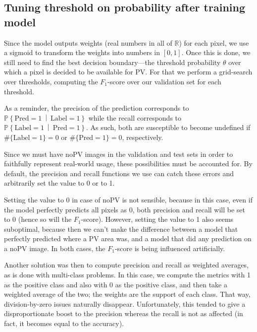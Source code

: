 \documentclass[10pt,conference]{IEEEtran}
\renewcommand\P[1]{\mathbb{P}\!\left\{#1\right\}}
\newcommand\given{\:\middle|\:}
\newcommand\tl[1]{\{\text{Label} = #1\}}
\newcommand\pl[1]{\{\text{Pred} = #1\}}
\begin{document}
\subsection{Tuning threshold on probability after training model} \label{ssec:threshold}
Since the model outputs weights (real numbers in all of $\mathbb{R}$) for each pixel,
we use a sigmoid to transform the weights into numbers in $[0,1]$.
Once this is done, we still need to find the best decision boundary---the threshold probability $\theta$ over which a pixel is decided to be available for PV.
For that we perform a grid-search over thresholds, computing the $F_1$-score over our validation set 
for each threshold.


As a reminder, the precision of the prediction
corresponds to $\P{\text{Pred}=1 \given \text{Label} = 1}$ while
the recall corresponds to $\P{\text{Label}=1 \given \text{Pred} = 1}$.
As such, both are susceptible to become undefined if
$\#\tl1 = 0$ or $\#\pl1 = 0$, respectively.

Since we must have noPV images in the validation and test sets in order to faithfully represent real-world usage,
these possibilities must be accounted for.
By default, the precision and recall functions we use
can catch these errors and arbitrarily set the value to
0 or to 1.

Setting the value to 0 in case of noPV is not sensible,
because in this case, even if the model perfectly predicts
all pixels as 0, both precision and recall will be set to 0
(hence so will the $F_1$-score).
However, setting the value to 1 also seems suboptimal, because
then we can't make the difference between a model that
perfectly predicted where a PV area was, and a model
that did any prediction on a noPV image.
In both cases, the $F_1$-score is being influenced artificially.

Another solution was then to compute precision and recall
as weighted averages, as is done with multi-class
problems.
In this case, we compute the metrics 
with 1 as the positive class and also with 0 as the
positive class, and then take a weighted average of
the two; the weights are the support of each class.
That way, division-by-zero issues naturally disappear.
Unfortunately, this tended to give a disproportionate
boost to the precision whereas the recall is not as
affected (in fact, it becomes equal to the accuracy).
\end{document}
